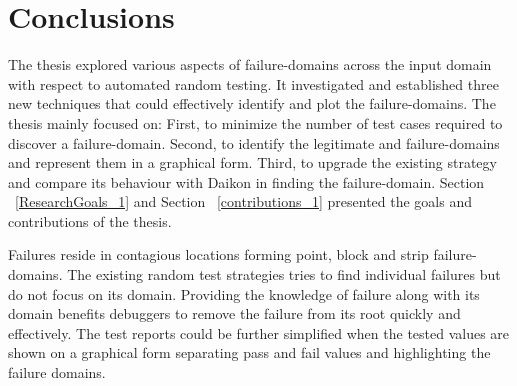 
\chapter{Conclusions}
\label{chap:conclusions_7}



The thesis explored various aspects of failure-domains across the input domain with respect to automated random testing. It investigated and established three new techniques that could effectively identify and plot the failure-domains. The thesis mainly focused on: First, to minimize the number of test cases required to discover a failure-domain.
Second, to identify the legitimate and failure-domains and represent them in a graphical form. Third, to upgrade the existing strategy and compare its behaviour with Daikon in finding the failure-domain.
 Section ~\ref{ResearchGoals_1} and Section ~\ref{contributions_1} presented the goals and contributions of the thesis.


Failures reside in contagious locations forming point, block and strip failure-domains. The existing random test strategies tries to find individual failures but do not focus on its domain. Providing the knowledge of failure along with its domain benefits debuggers to remove the failure from its root quickly and effectively. The test reports could be further simplified when the tested values are shown on a graphical form separating pass and fail values and highlighting the failure domains.


